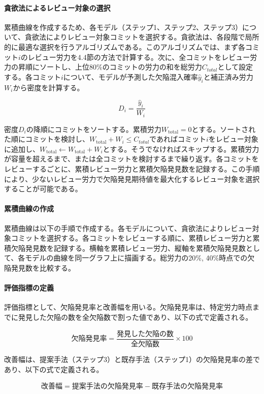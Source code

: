 \paragraph{貪欲法によるレビュー対象の選択}
累積曲線を作成するため、各モデル（ステップ1、ステップ2、ステップ3）について、貪欲法によりレビュー対象コミットを選択する。貪欲法は、各段階で局所的に最適な選択を行うアルゴリズムである。このアルゴリズムでは、まず各コミット$i$のレビュー労力を4.4節の方法で計算する。次に、全コミットをレビュー労力の昇順にソートし、上位80\%のコミットの労力の和を総労力$C_{total}$として設定する。各コミット$i$について、モデルが予測した欠陥混入確率$\hat{y}_i$と補正済み労力$W_i$から密度を計算する。

\[
D_i = \frac{\hat{y}_i}{W_i}
\]

密度$D_i$の降順にコミットをソートする。累積労力$W_{\text{total}} = 0$とする。ソートされた順にコミットを検討し、$W_{\text{total}} + W_i \leq C_{total}$であればコミット$i$をレビュー対象に追加し、$W_{\text{total}} \leftarrow W_{\text{total}} + W_i$とする。そうでなければスキップする。累積労力が容量を超えるまで、または全コミットを検討するまで繰り返す。各コミットをレビューするごとに、累積レビュー労力と累積欠陥発見数を記録する。この手順により、少ないレビュー労力で欠陥発見期待値を最大化するレビュー対象を選択することが可能である。

\paragraph{累積曲線の作成}
累積曲線は以下の手順で作成する。各モデルについて、貪欲法によりレビュー対象コミットを選択する。各コミットをレビューする順に、累積レビュー労力と累積欠陥発見数を記録する。横軸を累積レビュー労力、縦軸を累積欠陥発見数として、各モデルの曲線を同一グラフ上に描画する。総労力の20\%, 40\%時点での欠陥発見数を比較する。

\paragraph{評価指標の定義}
評価指標として、欠陥発見率と改善幅を用いる。欠陥発見率は、特定労力時点までに発見した欠陥の数を全欠陥数で割った値であり、以下の式で定義される。

\[
\text{欠陥発見率} = \frac{\text{発見した欠陥の数}}{\text{全欠陥数}} \times 100
\]

改善幅は、提案手法（ステップ3）と既存手法（ステップ1）の欠陥発見率の差であり、以下の式で定義される。

\[
\text{改善幅} = \text{提案手法の欠陥発見率} - \text{既存手法の欠陥発見率}
\]

